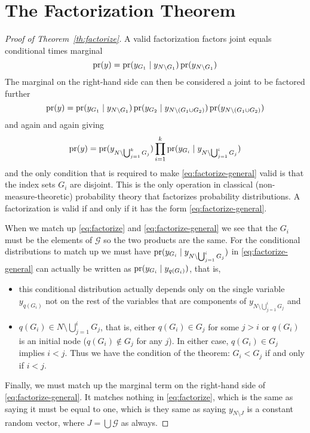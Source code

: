 
\chapter{The Factorization Theorem}
\label{app:factorize}

\begin{proof}[Proof of Theorem~\ref{th:factorize}]
A valid factorization factors joint equals conditional times marginal
$$
   \operatorname{pr}(y) = \operatorname{pr}(y_{G_1} \mid y_{N \setminus G_1}) \operatorname{pr}(y_{N \setminus G_1})
$$
The marginal on the right-hand side can then be considered a joint to be
factored further
$$
   \operatorname{pr}(y)
   =
   \operatorname{pr}(y_{G_1} \mid y_{N \setminus G_1})
   \operatorname{pr}(y_{G_2} \mid y_{N \setminus (G_1 \cup G_2)})
   \operatorname{pr}(y_{N \setminus (G_1 \cup G_2)})
$$
and again and again giving
\begin{equation} \label{eq:factorize-general}
   \operatorname{pr}(y)
   =
   \operatorname{pr}(y_{N \setminus \bigcup_{j = 1}^k G_j})
   \prod_{i = 1}^k
   \operatorname{pr}(y_{G_i} \mid y_{N \setminus \bigcup_{j = 1}^i G_j})
\end{equation}
and the only condition that is required to make \eqref{eq:factorize-general}
valid is that the index sets $G_i$ are disjoint.  This is the only operation
in classical (non-measure-theoretic) probability theory that factorizes
probability distributions.  A factorization is valid if and only if it
has the form \eqref{eq:factorize-general}.

When we match up \eqref{eq:factorize} and \eqref{eq:factorize-general}
we see that the $G_i$ must be the elements of $\mathcal{G}$ so the two
products are the same.  For the conditional distributions to
match up we must have $\operatorname{pr}(y_{G_i} \mid y_{N \setminus \bigcup_{j = 1}^i G_j})$
in \eqref{eq:factorize-general} can actually be written as
$\operatorname{pr}(y_{G_i} \mid y_{q(G_i)})$, that is,
\begin{itemize}
\item this conditional distribution actually depends only on the single
    variable $y_{q(G_i)}$ not on the rest of the variables that are components
    of $y_{N \setminus \bigcup_{j = 1}^i G_j}$ and
\item $q(G_i) \in N \setminus \bigcup_{j = 1}^i G_j$, that is, either
    $q(G_i) \in G_j$ for some $j > i$ or $q(G_i)$ is an initial node
    ($q(G_i) \notin G_j$ for any $j$).  In either case,
    $q(G_i) \in G_j$ implies $i < j$.  Thus we have the condition of
    the theorem: $G_i < G_j$ if and only if $i < j$.
\end{itemize}
Finally, we must match up the marginal term on the right-hand side of
\eqref{eq:factorize-general}.  It matches nothing in \eqref{eq:factorize},
which is the same as saying it must be equal to one, which is they same as
saying $y_{N \setminus J}$ is a constant random vector,
where $J = \bigcup \mathcal{G}$ as always.
\end{proof}

